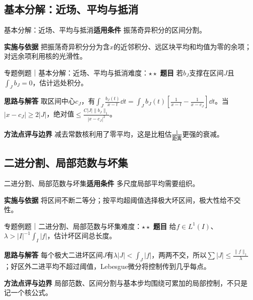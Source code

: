 \subsection{基本分解：近场、平均与抵消}\label{mat:fourier_advanced:basicstep}
\begin{method}{基本分解：近场、平均与抵消}\textbf{适用条件} 振荡奇异积分的区间分割。\par\textbf{实施与依据} 把振荡奇异积分分为含$x$的近邻积分、远区块平均和均值为零的余项；对远余项利用核的光滑性。\end{method}
\begin{example}{专题例题｜基本分解：近场、平均与抵消}{难度：$\star\star$}
\textbf{题目} 若$b_J$支撑在区间$J$且$\int_Jb_J=0$，估计远处积分。\par\textbf{思路与解答} 取区间中心$c_J$，有$\int_J\frac{b_J(t)}{x-t}\dd t=\int_Jb_J(t)[\frac{1}{x-t}-\frac{1}{x-c_J}]\dd t$。当$|x-c_J|\ge2|J|$，绝对值$\le \frac{C|J|\|b_J\|_1}{|x-c_J|^2}$。\par\textbf{方法点评与边界} 减去常数核利用了零平均，这是比粗估$\frac{1}{\text{距离}}$更强的衰减。
\end{example}
\subsection{二进分割、局部范数与坏集}\label{mat:fourier_advanced:dyadic}
\begin{method}{二进分割、局部范数与坏集}\textbf{适用条件} 多尺度局部平均需要组织。\par\textbf{实施与依据} 将区间不断二等分；按平均超阈值选择极大坏区间，极大性给不交性。\end{method}
\begin{example}{专题例题｜二进分割、局部范数与坏集}{难度：$\star\star$}
\textbf{题目} 给$f\in L^1(I)$、$\lambda>|I|^{-1}\int_I|f|$，估计坏区间总长度。\par\textbf{思路与解答} 每个极大二进坏区间$J$有$\lambda|J|<\int_J|f|$，两两不交，所以$\sum|J|\le\frac{\|f\|_1}{\lambda}$；好区外二进平均不超过阈值，Lebesgue微分将控制传到几乎每点。\par\textbf{方法点评与边界} 局部范数、区间分割与基本步均围绕可累加的局部控制，不只是记一个核公式。
\end{example}
